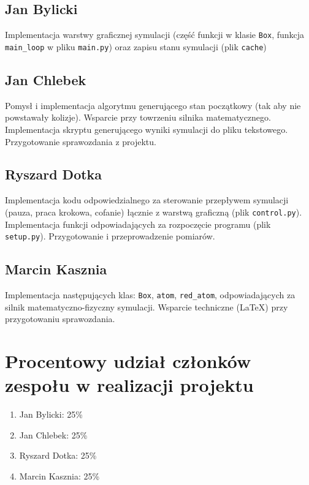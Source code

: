 \documentclass{article}
\begin{document}
    \subsection{Jan Bylicki}
        Implementacja warstwy graficznej symulacji (część funkcji w klasie \verb+Box+, funkcja \verb+main_loop+ w pliku \verb+main.py+) oraz zapisu stanu symulacji (plik \verb+cache+)
    \subsection{Jan Chlebek}
        Pomysł i implementacja algorytmu generującego stan początkowy (tak aby nie powstawały kolizje). Wsparcie przy towrzeniu silnika matematycznego. Implementacja skryptu generującego wyniki symulacji do pliku tekstowego. Przygotowanie sprawozdania z projektu.
    \subsection{Ryszard Dotka}
        Implementacja kodu odpowiedzialnego za sterowanie przepływem symulacji (pauza, praca krokowa, cofanie) łącznie z warstwą graficzną (plik \verb+control.py+). Implementacja funkcji odpowiadających za rozpoczęcie programu (plik \verb+setup.py+). Przygotowanie i przeprowadzenie pomiarów.
    \subsection{Marcin Kasznia}
        Implementacja następujących klas: \verb+Box+, \verb+atom+, \verb+red_atom+, odpowiadających za silnik matematyczno-fizyczny symulacji. Wsparcie techniczne (\LaTeX) przy przygotowaniu sprawozdania.

\section{Procentowy udział członków zespołu w realizacji projektu}
\begin{enumerate}
    \item Jan Bylicki: 25\%
    \item Jan Chlebek: 25\%
    \item Ryszard Dotka: 25\%
    \item Marcin Kasznia: 25\%
\end{enumerate}
\end{document}
